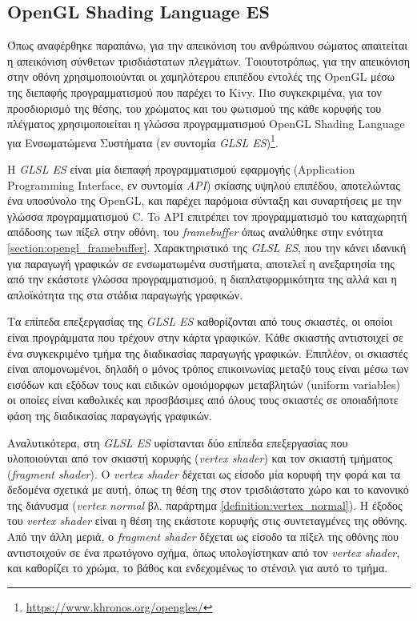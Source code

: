\subsection{OpenGL Shading Language ES}
Όπως αναφέρθηκε παραπάνω, για την απεικόνιση του ανθρώπινου σώματος απαιτείται η απεικόνιση σύνθετων τρισδιάστατων πλεγμάτων. Τοιουτοτρόπως, για την απεικόνιση στην οθόνη χρησιμοποιούνται οι χαμηλότερου επιπέδου εντολές της OpenGL μέσω της διεπαφής προγραμματισμού που παρέχει το Kivy. Πιο συγκεκριμένα, για τον προσδιορισμό της θέσης, του χρώματος και του φωτισμού της κάθε κορυφής του πλέγματος χρησιμοποιείται η γλώσσα προγραμματισμού OpenGL Shading Language για Ενσωματώμενα Συστήματα (εν συντομία \textsl{GLSL ES})\footnote{\href{https://www.khronos.org/opengles/}{https://www.khronos.org/opengles/}}.

H \textsl{GLSL ES} είναι μία διεπαφή προγραμματισμού εφαρμογής (Application Programming Interface, εν συντομία \textsl{API}) σκίασης υψηλού επιπέδου, αποτελώντας ένα υποσύνολο της OpenGL, και παρέχει παρόμοια σύνταξη και συναρτήσεις με την γλώσσα προγραμματισμού C. To API επιτρέπει τον προγραμματισμό του καταχωρητή απόδοσης των πίξελ στην οθόνη, του \textsl{framebuffer} όπως αναλύθηκε στην ενότητα \ref{section:opengl_framebuffer}. Χαρακτηριστικό της \textsl{GLSL ES}, που την κάνει ιδανική για παραγωγή γραφικών σε ενσωματωμένα συστήματα, αποτελεί η ανεξαρτησία της από την εκάστοτε γλώσσα προγραμματισμού, η διαπλατφορμικότητα της αλλά και η απλοϊκότητα της στα στάδια παραγωγής γραφικών.

Tα επίπεδα επεξεργασίας της \textsl{GLSL ES} καθορίζονται από τους σκιαστές, οι οποίοι είναι προγράμματα που τρέχουν στην κάρτα γραφικών. Κάθε σκιαστής αντιστοιχεί σε ένα συγκεκριμένο τμήμα της διαδικασίας παραγωγής γραφικών. Επιπλέον, οι σκιαστές είναι απομονωμένοι, δηλαδή ο μόνος τρόπος επικοινωνίας μεταξύ τους είναι μέσω των εισόδων και εξόδων τους και ειδικών ομοιόμορφων μεταβλητών (uniform variables) οι οποίες είναι καθολικές και προσβάσιμες από όλους τους σκιαστές σε οποιαδήποτε φάση της διαδικασίας παραγωγής γραφικών. 

Αναλυτικότερα, στη \textsl{GLSL ES} υφίστανται δύο επίπεδα επεξεργασίας που υλοποιούνται από τον σκιαστή κορυφής (\textsl{vertex shader}) και τον σκιαστή τμήματος (\textsl{fragment shader}). 
Ο \textsl{vertex shader} δέχεται ως είσοδο μία κορυφή την φορά και τα δεδομένα σχετικά με αυτή, όπως τη θέση της στον τρισδιάστατο χώρο και το κανονικό της διάνυσμα (\textsl{vertex normal} βλ. παράρτημα \ref{definition:vertex_normal}). Η έξοδος του \textsl{vertex shader} είναι η θέση της εκάστοτε κορυφής στις συντεταγμένες της οθόνης. Από την άλλη μεριά, ο \textsl{fragment shader} δέχεται ως είσοδο τα πίξελ της οθόνης που αντιστοιχούν σε ένα πρωτόγονο σχήμα, όπως υπολογίστηκαν από τον \textsl{vertex shader}, και καθορίζει το χρώμα, το βάθος και ενδεχομένως το στένσιλ για αυτό το τμήμα.